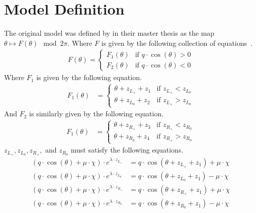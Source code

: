 \section{Model Definition}
\label{sec:og.def}

The original model was defined by  in their master thesis as the map $\theta \mapsto F(\theta) \mod 2 \pi$.
Where $F$ is given by the following collection of equations~\cite{akyuz2022}.
\begin{align}
    F(\theta) = \begin{cases}
                    F_1(\theta) & \text{if } q \cdot \cos(\theta) > 0 \\
                    F_2(\theta) & \text{if } q \cdot \cos(\theta) < 0
                \end{cases}
\end{align}
Where $F_1$ is given by the following equation.
\begin{align}
    F_1(\theta) & = \begin{cases}
                        \theta + z_{L_+} + z_1 & \text{if } z_{L_+} < z_{L_0} \\
                        \theta + z_{L_0} + z_2 & \text{if } z_{L_+} > z_{L_0}
                    \end{cases}
\end{align}
And $F_2$ is similarly given by the following equation.
\begin{align}
    F_1(\theta) & = \begin{cases}
                        \theta + z_{R_+} + z_3 & \text{if } z_{R_+} < z_{R_0} \\
                        \theta + z_{R_0} + z_4 & \text{if } z_{R_+} > z_{R_0}
                    \end{cases}
\end{align}
$z_{L_+}, z_{L_0}, z_{R_+},$ and $z_{R_0}$ must satisfy the following equations.
\begin{subequations}
    \begin{align}
        (q \cdot \cos(\theta) + \mu \cdot \chi) \cdot e^{\lambda \cdot z_{L_+}}
         & = q \cdot \cos(\theta + z_{L_+} + z_1) + \mu \cdot \chi \\
        (q \cdot \cos(\theta) + \mu \cdot \chi) \cdot e^{\lambda \cdot z_{L_0}}
         & = q \cdot \cos(\theta + z_{L_0} + z_1) - \mu \cdot \chi \\
        (q \cdot \cos(\theta) + \mu \cdot \chi) \cdot e^{\lambda \cdot z_{R_+}}
         & = q \cdot \cos(\theta + z_{R_+} + z_1) + \mu \cdot \chi \\
        (q \cdot \cos(\theta) + \mu \cdot \chi) \cdot e^{\lambda \cdot z_{R_0}}
         & = q \cdot \cos(\theta + z_{R_0} + z_1) - \mu \cdot \chi
    \end{align}
\end{subequations}
